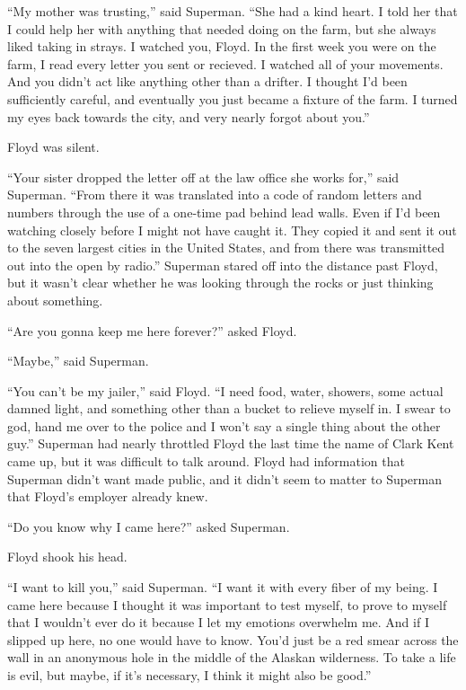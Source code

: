 \documentclass[ebook,12pt]{memoir}
\begin{document}
``My mother was trusting,'' said Superman. ``She had a kind heart. I
told her that I could help her with anything that needed doing on the
farm, but she always liked taking in strays. I watched you, Floyd. In
the first week you were on the farm, I read every letter you sent or
recieved. I watched all of your movements. And you didn't act like
anything other than a drifter. I thought I'd been sufficiently careful,
and eventually you just became a fixture of the farm. I turned my eyes
back towards the city, and very nearly forgot about you.''

Floyd was silent.

``Your sister dropped the letter off at the law office she works for,''
said Superman. ``From there it was translated into a code of random
letters and numbers through the use of a one‐time pad behind lead walls.
Even if I'd been watching closely before I might not have caught it.
They copied it and sent it out to the seven largest cities in the United
States, and from there was transmitted out into the open by radio.''
Superman stared off into the distance past Floyd, but it wasn't clear
whether he was looking through the rocks or just thinking about
something.

``Are you gonna keep me here forever?'' asked Floyd.

``Maybe,'' said Superman.

``You can't be my jailer,'' said Floyd. ``I need food, water, showers,
some actual damned light, and something other than a bucket to relieve
myself in. I swear to god, hand me over to the police and I won't say a
single thing about the other guy.'' Superman had nearly throttled Floyd
the last time the name of Clark Kent came up, but it was difficult to
talk around. Floyd had information that Superman didn't want made
public, and it didn't seem to matter to Superman that Floyd's employer
already knew.

``Do you know why I came here?'' asked Superman.

Floyd shook his head.

``I want to kill you,'' said Superman. ``I want it with every fiber of
my being. I came here because I thought it was important to test myself,
to prove to myself that I wouldn't ever do it because I let my emotions
overwhelm me. And if I slipped up here, no one would have to know. You'd
just be a red smear across the wall in an anonymous hole in the middle
of the Alaskan wilderness. To take a life is evil, but maybe, if it's
necessary, I think it might also be good.''
\end{document}
